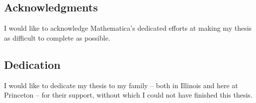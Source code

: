 \documentclass[a4paper,11pt]{article}
\begin{document}
 \newpage
{}
\subsection*{Acknowledgments}
\small
I would like to acknowledge Mathematica's dedicated efforts at making my thesis as difficult to complete as possible.

\newpage
{}
\subsection*{Dedication}
\small
I would like to dedicate my thesis to my family -- both in Illinois and here at Princeton -- for their support, without which I could not have finished this thesis.

\newpage
{}
\renewcommand*\contentsname{\LARGE CONTENTS}
\tableofcontents
\linespread{1.6}
\setlength{\parskip}{1.7mm}

\newpage
{}
\listoffigures
{}

\linespread{1.6} %
\end{document}
